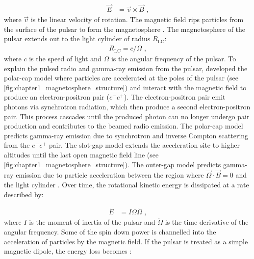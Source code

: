 \begin{equation}
    \begin{aligned}
    \vec{E} &= \vec{v} \times \vec{B}\text{ ,}
    \end{aligned}
\end{equation}
where $\vec{v}$ is the linear velocity of rotation. The magnetic field rips particles from the surface of the pulsar to form the magnetosphere \cite{1968Natur.218..731G,1969ApJ...157..869G}. The magnetosphere of the pulsar extends out to the light cylinder of radius $R_\text{LC}$:
\begin{equation}
    \begin{aligned}
    R_\text{LC}=c/\Omega\text{ ,}
    \end{aligned}
\end{equation}
where $c$ is the speed of light and $\Omega$ is the angular frequency of the pulsar.
\newpar
To explain the pulsed radio and gamma-ray emission from the pulsar, \cite{1971ApJ...164..529S} developed the polar-cap model where particles are accelerated at the poles of the pulsar (see \autoref{fig:chapter1_magnetosphere_structure}) and interact with the magnetic field to produce an electron-positron pair ($e^-e^+$). The electron-positron pair emit photons via synchrotron radiation, which then produce a second electron-positron pair. This process cascades until the produced photon can no longer undergo pair production and contributes to the beamed radio emission. The polar-cap model predicts gamma-ray emission due to synchrotron and inverse Compton scattering from the $e^-e^+$ pair. The slot-gap model \citep{1983ApJ...266..215A} extends the acceleration site to higher altitudes until the last open magnetic field line (see \autoref{fig:chapter1_magnetosphere_structure}). The outer-gap model predicts gamma-ray emission due to particle acceleration between the region where $\vec{\Omega}\cdot\vec{B}=0$ and the light cylinder \citep{1986ApJ...300..500C}.
\newpar
Over time, the rotational kinetic energy is dissipated at a rate described by:

\begin{equation}
    \begin{aligned}
        \dot{E}&=I\Omega\dot{\Omega}\text{ ,}
    \end{aligned}
\end{equation}
\noindent where $I$ is the moment of inertia of the pulsar and $\dot{\Omega}$ is the time derivative of the angular frequency. Some of the spin down power is channelled into the acceleration of particles by the magnetic field. If the pulsar is treated as a simple magnetic dipole, the energy loss becomes \citep{Slane2017}: 

